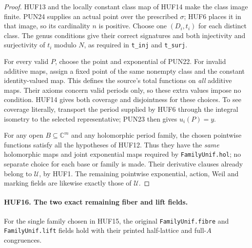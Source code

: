\documentclass[11pt,a4paper]{article}
\numberwithin{equation}{section}
\theoremstyle{remark}\newtheorem{remark}[theorem]{Remark}
\begin{document}
\begin{proof}
HUF13 and the locally constant class map of HUF14
make the class image finite.  PUN24 supplies an
actual point over the prescribed \(\sigma\);
HUF6 places it in that image, so its cardinality
\(n\) is positive.
Choose one \((D_i,t_i)\) for each distinct class.
The genus conditions give their correct signatures
and both injectivity and surjectivity of \(t_i\)
modulo \(N\), as required in \texttt{t\_\allowbreak inj}
and \texttt{t\_\allowbreak surj}.

For every valid \(P\), choose the point and
exponential of PUN22.  For invalid additive maps,
assign a fixed point of the same nonempty class
and the constant identity-valued map.
This defines the source's total functions on
\emph{all} additive maps.  Their axioms concern
valid periods only, so these extra values impose
no condition.  HUF14 gives both coverage and
disjointness for these choices.  To see coverage
literally, transport the period supplied by HUF6
through the integral isometry to the selected
representative; PUN23 then gives \(u_i(P)=y\).

For any open \(B\subseteq\mathbb C^m\) and any
holomorphic period family, the chosen pointwise
functions satisfy all the hypotheses of HUF12.
Thus they have the \emph{same} holomorphic maps
and joint exponential maps required by
\texttt{Family\allowbreak Unif.\allowbreak hol}; no separate choice for
each base or family is made.  Their derivative
clauses already belong to \(\mathcal U\), by HUF1.
The remaining pointwise exponential, action,
Weil and marking fields are likewise exactly
those of \(\mathcal U\).
\end{proof}

\paragraph{HUF16. The two exact remaining fiber and lift fields.}
\label{claim:HUF16}
For the single family chosen in HUF15, the
original \texttt{Family\allowbreak Unif.\allowbreak fibre} and
\texttt{Family\allowbreak Unif.\allowbreak lift} fields hold with their
printed half-lattice and full-\(A\) congruences.
\end{document}
